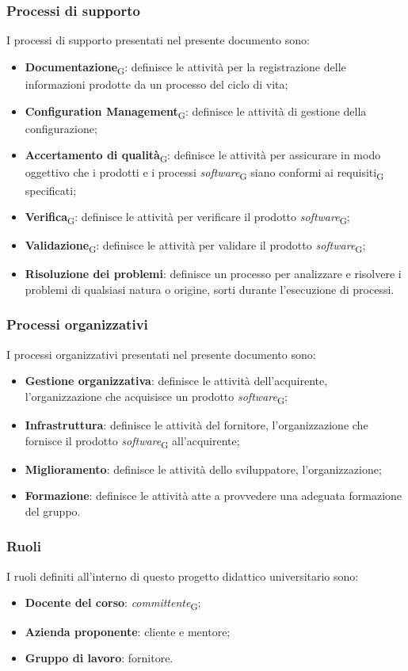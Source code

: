 \subsubsection{Processi di supporto}
I processi di supporto presentati nel presente documento sono:
\begin{itemize}
\item \textbf{Documentazione}\textsubscript{G}: definisce le attività per la registrazione delle informazioni prodotte da un processo del ciclo di vita;
\item \textbf{Configuration Management}\textsubscript{G}: definisce le attività di gestione della configurazione;
\item \textbf{Accertamento di qualità}\textsubscript{G}: definisce le attività per assicurare in modo oggettivo che i prodotti e i processi \textit{software}\textsubscript{G} siano conformi ai requisiti\textsubscript{G} specificati;
\item \textbf{Verifica}\textsubscript{G}: definisce le attività per verificare il prodotto \textit{software}\textsubscript{G};
\item \textbf{Validazione}\textsubscript{G}: definisce le attività per validare il prodotto \textit{software}\textsubscript{G};
\item \textbf{Risoluzione dei problemi}: definisce un processo per analizzare e risolvere i problemi di qualsiasi natura o origine, sorti durante l’esecuzione di processi.
\end{itemize}


\subsubsection{Processi organizzativi}
I processi organizzativi presentati nel presente documento sono:
\begin{itemize}
\item \textbf{Gestione organizzativa}: definisce le attività dell’acquirente, l’organizzazione che acquisisce un prodotto \textit{software}\textsubscript{G};
\item \textbf{Infrastruttura}: definisce le attività del fornitore, l’organizzazione che fornisce il prodotto \textit{software}\textsubscript{G} all’acquirente;
\item \textbf{Miglioramento}: definisce le attività dello sviluppatore, l’organizzazione;
\item \textbf{Formazione}: definisce le attività atte a provvedere una adeguata formazione del gruppo.
\end{itemize}

\subsubsection{Ruoli}
I ruoli definiti all’interno di questo progetto didattico universitario sono:
\begin{itemize}
\item \textbf{Docente del corso}: \textit{committente}\textsubscript{G};
\item \textbf{Azienda proponente}: cliente e mentore;
\item \textbf{Gruppo di lavoro}: fornitore.
\end{itemize}